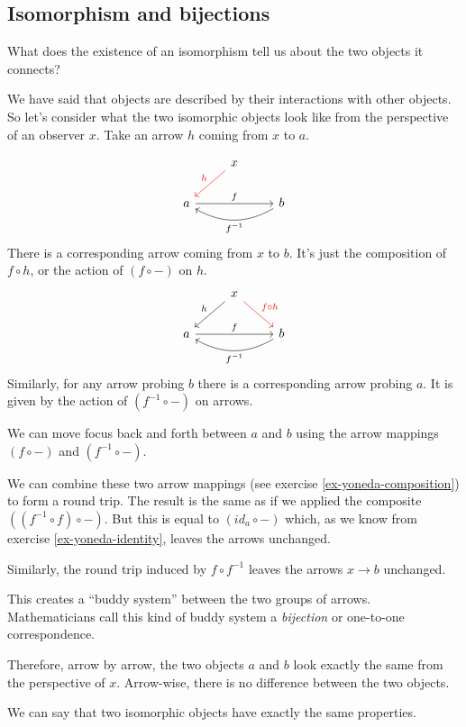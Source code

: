 \documentclass[DaoFP]{subfiles}
\begin{document}
\subsection{Isomorphism and bijections}

What does the existence of an isomorphism tell us about the two objects it connects? 

We have said that objects are described by their interactions with other objects. So let's consider what the two isomorphic objects look like from the perspective of an observer  $x$. Take an arrow $h$ coming from $x$ to $a$.

\[
 \begin{tikzcd}
 & x
 \arrow[ld, red, "h"']
 \\
 a
 \arrow[rr, "f"]
  && b
 \arrow[ll, bend left,  "f^{-1}"]
 \end{tikzcd}
\]
There is a corresponding arrow coming from $x$ to $b$. It's just the composition of $f \circ h$, or the action of $(f \circ -)$ on $h$.
\[
 \begin{tikzcd}
 & x
 \arrow[ld, "h"']
 \arrow[rd, red, "f \circ h"]
 \\
 a
 \arrow[rr, "f"]
  && b
 \arrow[ll, bend left,  "f^{-1}"]
 \end{tikzcd}
\]
Similarly, for any arrow probing $b$ there is a corresponding arrow probing $a$. It is given by the action of  $(f^{-1} \circ -)$ on arrows. 

We can move focus back and forth between $a$ and $b$ using the arrow mappings $(f \circ -)$ and $(f^{-1} \circ -)$.

We can combine these two arrow mappings (see exercise \ref{ex-yoneda-composition}) to form a round trip. The result is the same as if we applied the composite $((f^{-1} \circ f) \circ -)$. But this is equal to $(id_a \circ  -)$ which, as we know from exercise \ref{ex-yoneda-identity}, leaves the arrows unchanged.

Similarly, the round trip induced by $f \circ f^{-1}$ leaves the arrows $x \to b$ unchanged. 

This creates a ``buddy system'' between the two groups of arrows. Mathematicians call this kind of buddy system a \emph{bijection} or one-to-one correspondence.

Therefore, arrow by arrow, the two objects $a$ and $b$ look exactly the same from the perspective of $x$. Arrow-wise, there is no difference between the two objects. 

We can say that two isomorphic objects have exactly the same properties.
\end{document}
